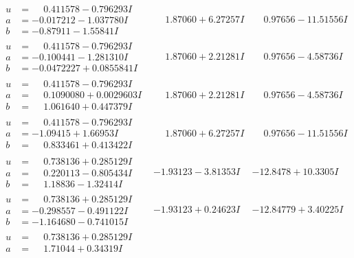 \documentclass[1p]{elsarticle_modified}
\theoremstyle{definition}
\begin{document}
$$\begin{array}{c|c|c}
\begin{aligned}
u &= \phantom{-}0.411578 - 0.796293 I \\
a &= -0.017212 - 1.037780 I \\
b &= -0.87911 - 1.55841 I\end{aligned}
 & \phantom{-}1.87060 + 6.27257 I & \phantom{-}0.97656 - 11.51556 I \\ \hline\begin{aligned}
u &= \phantom{-}0.411578 - 0.796293 I \\
a &= -0.100441 - 1.281310 I \\
b &= -0.0472227 + 0.0855841 I\end{aligned}
 & \phantom{-}1.87060 + 2.21281 I & \phantom{-}0.97656 - 4.58736 I \\ \hline\begin{aligned}
u &= \phantom{-}0.411578 - 0.796293 I \\
a &= \phantom{-}0.1090080 + 0.0029603 I \\
b &= \phantom{-}1.061640 + 0.447379 I\end{aligned}
 & \phantom{-}1.87060 + 2.21281 I & \phantom{-}0.97656 - 4.58736 I \\ \hline\begin{aligned}
u &= \phantom{-}0.411578 - 0.796293 I \\
a &= -1.09415 + 1.66953 I \\
b &= \phantom{-}0.833461 + 0.413422 I\end{aligned}
 & \phantom{-}1.87060 + 6.27257 I & \phantom{-}0.97656 - 11.51556 I \\ \hline\begin{aligned}
u &= \phantom{-}0.738136 + 0.285129 I \\
a &= \phantom{-}0.220113 - 0.805434 I \\
b &= \phantom{-}1.18836 - 1.32414 I\end{aligned}
 & -1.93123 - 3.81353 I & -12.8478 + 10.3305 I \\ \hline\begin{aligned}
u &= \phantom{-}0.738136 + 0.285129 I \\
a &= -0.298557 - 0.491122 I \\
b &= -1.164680 - 0.741015 I\end{aligned}
 & -1.93123 + 0.24623 I & -12.84779 + 3.40225 I \\ \hline\begin{aligned}
u &= \phantom{-}0.738136 + 0.285129 I \\
a &= \phantom{-}1.71044 + 0.34319 I \\

\end{aligned}
\end{array}$$
\end{document}
